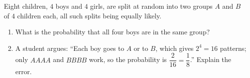 Eight children, $4$ boys and $4$ girls, are split at random into two groups $A$ and $B$ of $4$ children each, all such splits being equally likely.
\begin{enumerate}
\item[(a)] What is the probability that all four boys are in the same group?
\item[(b)] A student argues: ``Each boy goes to $A$ or to $B$, which gives $2^4=16$ patterns; only $AAAA$ and $BBBB$ work, so the probability is $\dfrac{2}{16}=\dfrac{1}{8}$.'' Explain the error.
\end{enumerate}
